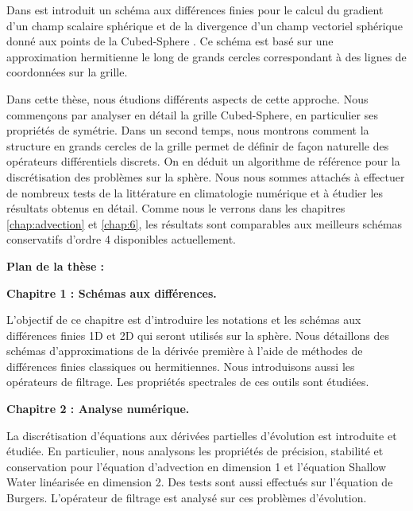 Dans \cite{Croisille2013,Croisille2015} est introduit un schéma aux différences finies pour le calcul du gradient d'un champ scalaire sphérique et de la divergence d'un champ vectoriel sphérique donné aux points de la Cubed-Sphere \cite{Sadourny1972}. Ce schéma est basé sur une approximation hermitienne le long de grands cercles correspondant à des lignes de coordonnées sur la grille.

Dans cette thèse, nous étudions différents aspects de cette approche. Nous commençons par analyser en détail la grille Cubed-Sphere, en particulier ses propriétés de symétrie. Dans un second temps, nous montrons comment la structure en grands cercles de la grille permet de définir de façon naturelle des opérateurs différentiels discrets. On en déduit un algorithme de référence pour la discrétisation des problèmes sur la sphère. Nous nous sommes attachés à effectuer de nombreux tests de la littérature en climatologie numérique et à étudier les résultats obtenus en détail. Comme nous le verrons dans les chapitres \ref{chap:advection} et \ref{chap:6}, les résultats sont comparables aux meilleurs schémas conservatifs d'ordre 4 disponibles actuellement.














 


\newpage
\textbf{Plan de la thèse :}

\textbf{Chapitre 1 : Schémas aux différences.}

L'objectif de ce chapitre est d'introduire les notations et les schémas aux différences finies 1D et 2D qui seront utilisés sur la sphère. Nous détaillons des schémas d'approximations de la dérivée première à l'aide de méthodes de différences finies classiques ou hermitiennes. Nous introduisons aussi les opérateurs de filtrage. Les propriétés spectrales de ces outils sont étudiées.







\vspace{0.7cm}
\textbf{Chapitre 2 : Analyse numérique.}

La discrétisation d'équations aux dérivées partielles d'évolution est introduite et étudiée. En particulier, nous analysons les propriétés de précision, stabilité et conservation pour l'équation d'advection en dimension 1 et l'équation Shallow Water linéarisée en dimension 2. Des tests sont aussi effectués sur l'équation de Burgers. L'opérateur de filtrage est analysé sur ces problèmes d'évolution.







